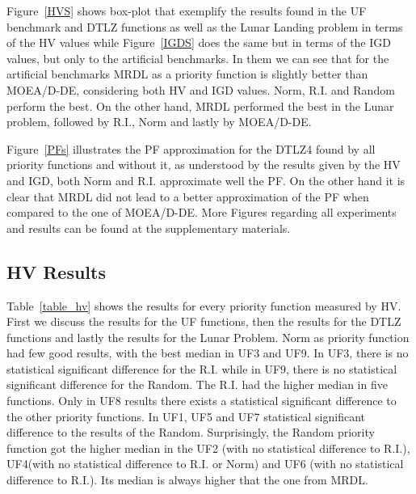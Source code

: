 
Figure~\ref{HVS} shows box-plot that exemplify the results found in the UF benchmark and DTLZ functions as well as the Lunar Landing problem in terms of the HV values while Figure~\ref{IGDS} does the same but in terms of the IGD values, but only to the artificial benchmarks. In them we can see that for the artificial benchmarks MRDL as a priority function is slightly better than MOEA/D-DE, considering both HV and IGD values. Norm, R.I. and Random perform the best. On the other hand, MRDL performed the best in the Lunar problem, followed by R.I., Norm and lastly by MOEA/D-DE.


Figure~\ref{PFs} illustrates the PF approximation for the DTLZ4 found by all priority functions and without it, as understood by the results given by the HV and IGD, both Norm and R.I. approximate well the PF. On the other hand it is clear that MRDL did not lead to a better approximation of the PF when compared to the one of MOEA/D-DE. More Figures regarding all experiments and results can be found at the supplementary materials.

\subsection{HV Results}

Table~\ref{table_hv} shows the results for every priority function measured by HV. First we discuss the results for the UF functions, then the results for the DTLZ functions and lastly the results for the Lunar Problem. Norm as priority function had few good results, with  the best median in UF3 and UF9. In UF3, there is no statistical significant difference for the R.I. while in UF9, there is no statistical significant difference for the Random. The R.I. had the higher median in five functions. Only in UF8 results there exists a statistical significant difference to the other priority functions.  In UF1, UF5 and UF7 statistical significant difference to the results of the Random. Surprisingly, the Random priority function got the higher median in the UF2 (with no statistical difference to R.I.), UF4(with no statistical difference to R.I. or Norm) and UF6 (with no statistical difference to R.I.). Its median is always higher that the one from MRDL. 

